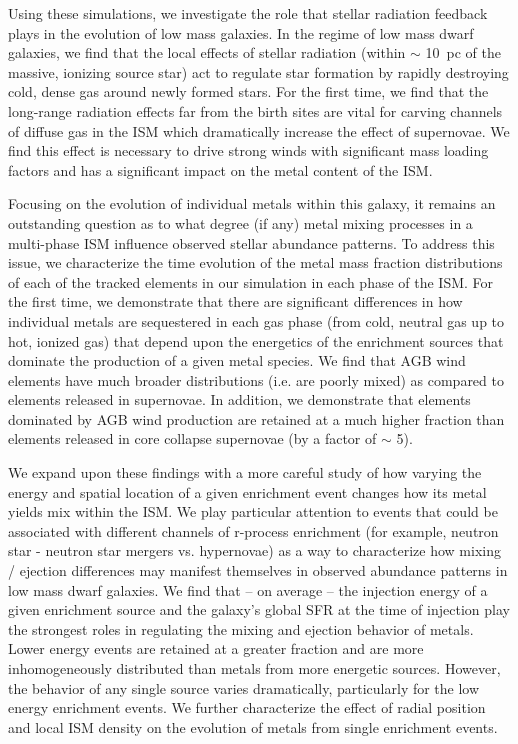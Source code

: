 Using these simulations, we investigate the role that stellar radiation feedback plays in the evolution of low mass galaxies.
In the regime of low mass dwarf galaxies, we find that the local effects of stellar radiation (within $\sim$ 10~pc of the massive, ionizing source star) act to regulate star formation by rapidly destroying cold, dense gas around newly formed stars. For the first time, we find that the long-range radiation effects far from the birth sites are vital for carving channels of diffuse gas in the ISM which dramatically increase the effect of supernovae. We find this effect is necessary to drive strong winds with significant mass loading factors and has a significant impact on the metal content of the ISM.

Focusing on the evolution of individual metals within this galaxy, it remains an outstanding question as to what degree (if any) metal mixing processes in a multi-phase ISM influence observed stellar abundance patterns. To address this issue, we characterize the time evolution of the metal mass fraction distributions of each of the tracked elements in our simulation in each phase of the ISM. For the first time, we demonstrate that there are significant differences in how individual metals are sequestered in each gas phase (from cold, neutral gas up to hot, ionized gas) that depend upon the energetics of the enrichment sources that dominate the production of a given metal species. We find that AGB wind elements have much broader distributions (i.e. are poorly mixed) as compared to elements released in supernovae. In addition, we demonstrate that elements dominated by AGB wind production are retained at a much higher fraction than elements released in core collapse supernovae (by a factor of $\sim$ 5).

We expand upon these findings with a more careful study of how varying the energy and spatial location of a given enrichment event changes how its metal yields mix within the ISM. We play particular attention to events that could be associated with different channels of r-process enrichment (for example, neutron star - neutron star mergers vs. hypernovae) as a way to characterize how mixing / ejection differences may manifest themselves in observed abundance patterns in low mass dwarf galaxies. We find that -- on average -- the injection energy of a given enrichment source and the galaxy's global SFR at the time of injection play the strongest roles in regulating the mixing and ejection behavior of metals. Lower energy events are retained at a greater fraction and are more inhomogeneously distributed than metals from more energetic sources. However, the behavior of any single source varies dramatically, particularly for the low energy enrichment events. We further characterize the
effect of radial position and local ISM density on the evolution of metals from single enrichment events.

